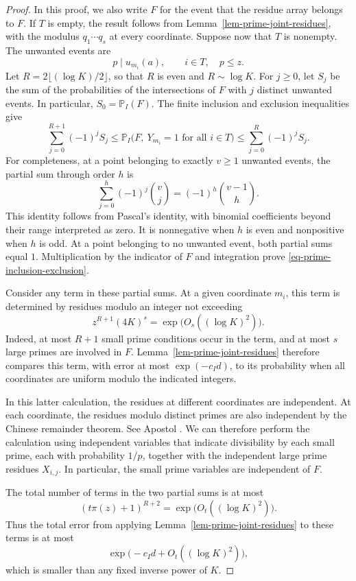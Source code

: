 \documentclass[11pt,reqno]{amsart}
\numberwithin{equation}{section}
\begin{document}
\begin{proof}
In this proof, we also write $F$ for the event that the residue array belongs to $F$. If $T$ is empty, the result follows from Lemma~\ref{lem-prime-joint-residues}, with the modulus $q_1\cdots q_s$ at every coordinate. Suppose now that $T$ is nonempty. The unwanted events are
\[
 p\mid u_{m_i}(a),\qquad i\in T,\quad p\le z.
\]
Let $R=2\lfloor(\log K)/2\rfloor$, so that $R$ is even and $R\sim\log K$. For $j\ge0$, let $S_j$ be the sum of the probabilities of the intersections of $F$ with $j$ distinct unwanted events. In particular, $S_0=\mathbb P_I(F)$. The finite inclusion and exclusion inequalities give
\begin{equation}\label{eq-prime-inclusion-exclusion}
 \sum_{j=0}^{R+1}(-1)^jS_j
 \le \mathbb P_I\bigl(F,\ Y_{m_i}=1\text{ for all }i\in T\bigr)
 \le \sum_{j=0}^{R}(-1)^jS_j.
\end{equation}
For completeness, at a point belonging to exactly $v\ge1$ unwanted events, the partial sum through order $h$ is
\[
 \sum_{j=0}^h(-1)^j\binom vj=(-1)^h\binom{v-1}{h}.
\]
This identity follows from Pascal's identity, with binomial coefficients beyond their range interpreted as zero. It is nonnegative when $h$ is even and nonpositive when $h$ is odd. At a point belonging to no unwanted event, both partial sums equal $1$. Multiplication by the indicator of $F$ and integration prove \eqref{eq-prime-inclusion-exclusion}.

Consider any term in these partial sums. At a given coordinate $m_i$, this term is determined by residues modulo an integer not exceeding
\[
 z^{R+1}(4K)^s=\exp\bigl(O_s((\log K)^2)\bigr).
\]
Indeed, at most $R+1$ small prime conditions occur in the term, and at most $s$ large primes are involved in $F$. Lemma~\ref{lem-prime-joint-residues} therefore compares this term, with error at most $\exp(-c_I d)$, to its probability when all coordinates are uniform modulo the indicated integers.

In this latter calculation, the residues at different coordinates are independent. At each coordinate, the residues modulo distinct primes are also independent by the Chinese remainder theorem. See Apostol \cite[Ch.~6]{Apostol}. We can therefore perform the calculation using independent variables that indicate divisibility by each small prime, each with probability $1/p$, together with the independent large prime residues $X_{i,j}$. In particular, the small prime variables are independent of $F$.

The total number of terms in the two partial sums is at most
\[
 (t\pi(z)+1)^{R+2}=\exp\bigl(O_t((\log K)^2)\bigr).
\]
Thus the total error from applying Lemma~\ref{lem-prime-joint-residues} to these terms is at most
\[
 \exp\bigl(-c_I d+O_t((\log K)^2)\bigr),
\]
which is smaller than any fixed inverse power of $K$.


\end{proof}
\end{document}
